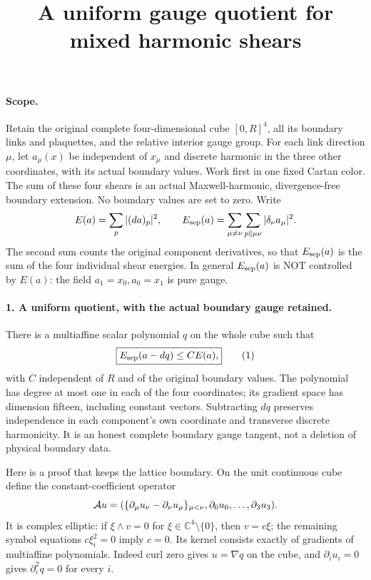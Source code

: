 \documentclass[11pt]{article}
\title{A uniform gauge quotient for mixed harmonic shears}\author{}\date{}
\begin{document}
\maketitle
\paragraph{Scope.}
Retain the original complete four-dimensional cube $[0,R]^4$, all its
boundary links and plaquettes, and the relative interior gauge group.
For each link direction $\mu$, let $a_\mu(x)$ be independent of $x_\mu$
and discrete harmonic in the three other coordinates, with its actual
boundary values. Work first in one fixed Cartan color. The sum of these
four shears is an actual Maxwell-harmonic, divergence-free boundary
extension. No boundary values are set to zero. Write
\[
 E(a)=\sum_p|(da)_p|^2,\qquad
 E_{\rm sep}(a)=\sum_{\mu\ne\nu}\sum_{p\parallel\mu\nu}
                         |\delta_\nu a_\mu|^2 .
\]
The second sum counts the original component derivatives, so that
$E_{\rm sep}(a)$ is the sum of the four individual shear energies.
In general $E_{\rm sep}(a)$ is NOT controlled by $E(a)$: the field
$a_1=x_0,a_0=x_1$ is pure gauge.

\paragraph{1. A uniform quotient, with the actual boundary gauge retained.}
There is a multiaffine scalar polynomial $q$ on the whole cube such that
\[
 \boxed{E_{\rm sep}(a-dq)\le C E(a),}                         \tag{1}
\]
with $C$ independent of $R$ and of the original boundary values.
The polynomial has degree at most one in each of the four coordinates;
its gradient space has dimension fifteen, including constant vectors.
Subtracting $dq$ preserves independence in each component's own
coordinate and transverse discrete harmonicity. It is an honest
complete boundary gauge tangent, not a deletion of physical boundary data.

Here is a proof that keeps the lattice boundary.
On the unit continuous cube define the constant-coefficient operator
\[
 {\cal A}u=(\{\partial_\mu u_\nu-\partial_\nu u_\mu\}_{\mu<\nu},
                  \partial_0u_0,\ldots,\partial_3u_3).
\]
It is complex elliptic: if $\xi\wedge v=0$ for $\xi\in\mathbb C^4
\setminus\{0\}$, then $v=c\xi$; the remaining symbol equations
$c\xi_i^2=0$ imply $c=0$.
Its kernel consists exactly of gradients of multiaffine polynomials.
Indeed curl zero gives $u=\nabla q$ on the cube, and
$\partial_i u_i=0$ gives $\partial_i^2q=0$ for every $i$.
\end{document}
